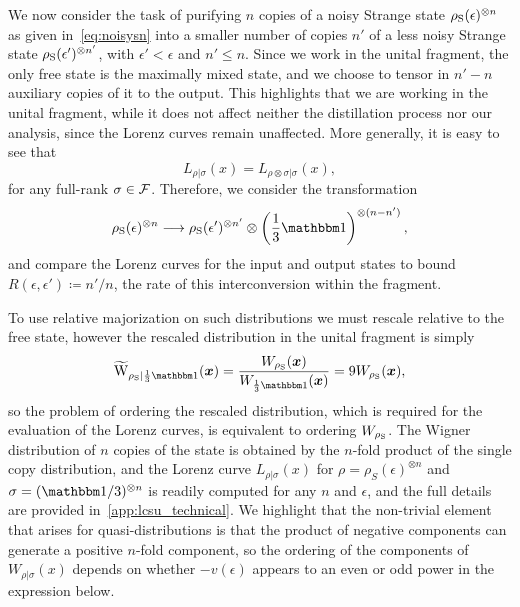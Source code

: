 \documentclass[pra,
aps,
twocolumn,
superscriptaddress,
groupedaddress,
nofootinbib,
reprint
]{revtex4-1}
\begin{document}
We now consider the task of purifying $n$ copies of a noisy Strange state $\rho_{\rm{S}}(\epsilon)^{\otimes n}$ as given in~\cref{eq:noisysn} into a smaller number of copies $n'$ of a less noisy Strange state $\rho_{\rm{S}}(\epsilon')^{\otimes n'}$, with $\epsilon' < \epsilon$ and $n' \leq n$. Since we work in the unital fragment, the only free state is the maximally mixed state, and we choose to tensor in $n'-n$ auxiliary copies of it to the output. This highlights that we are working in the unital fragment, while it does not affect neither the distillation process nor our analysis, since the Lorenz curves remain unaffected. More generally, it is easy to see that
\begin{equation}
	L_{\rho |\sigma} (x) = L_{\rho \otimes \sigma |\sigma}(x),
\end{equation}
for any full-rank $\sigma \in \mathcal{F}$. Therefore, we consider the transformation
\begin{equation}\label{eq:sudist}
	\rho_{\rm{S}}(\epsilon)^{\otimes n} \longrightarrow \rho_{\rm{S}}(\epsilon')^{\otimes n'} \otimes \left( \frac{1}{3}\id \right)^{\otimes (n-n')},
\end{equation}
and compare the Lorenz curves for the input and output states to bound $R(\epsilon, \epsilon') \coloneqq n'/n$, the rate of this interconversion within the fragment.

To use relative majorization on such distributions we must rescale relative to the free state, however the rescaled distribution in the unital fragment is simply
\begin{equation}
	\widetilde{\rm{W}}_{\rho_{\rm{S}}|\frac{1}{3}\id}(\bmx) = \frac{\W[\bmx]{\rho_{\rm{S}}}}{\W[\bmx]{\frac{1}{3}\id}} = 9\W[\bmx]{\rho_{\rm{S}}},
\end{equation}
so the problem of ordering the rescaled distribution, which is required for the evaluation of the Lorenz curves, is equivalent to ordering $\W{\rho_{\rm{S}}}$. The Wigner distribution of $n$ copies of the state is obtained by the $n$-fold product of the single copy distribution, and the Lorenz curve $L_{\rho|\sigma}(x)$ for $\rho = \rho_S(\epsilon)^{\otimes n}$ and $\sigma = (\I/3)^{\otimes n}$ is readily computed for any $n$ and $\epsilon$, and the full details are provided in~\cref{app:lcsu_technical}.
We highlight that the non-trivial element that arises for quasi-distributions is that the product of negative components can generate a positive $n$-fold component, so the ordering of the components of $W_{\rho |\sigma}(x)$ depends on whether $-v(\epsilon)$ appears to an even or odd power in the expression below.
\end{document}
